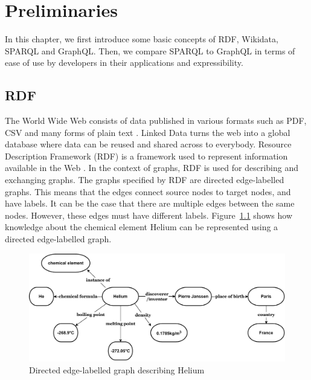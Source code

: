 \chapter{Preliminaries}
In this chapter, we first introduce some basic concepts of RDF, Wikidata, SPARQL and GraphQL. Then, we compare SPARQL to GraphQL in terms of ease of use by developers in their applications and expressibility.

\section{RDF}
The World Wide Web consists of data published in various formats such as PDF, CSV and many forms of plain text \cite{Ruth2013}. Linked Data turns the web into a global database where data can be reused and shared across to everybody. Resource Description Framework (RDF) is a framework used to represent information available in the Web \cite{R.Cyganiak2014}. In the context of graphs, RDF is used for describing and exchanging graphs. The graphs specified by RDF are directed edge-labelled graphs. This means that the edges connect source nodes to target nodes, and have labels. It can be the case that there are multiple edges between the same nodes. However, these edges must have different labels. Figure~\ref{fig:figure 1} shows how knowledge about the chemical element Helium can be represented using a directed edge-labelled graph.

\begin{figure}[h]
  \centering
  \includegraphics[width=0.80\linewidth]{images/del_graph.drawio.pdf}
  \caption{Directed edge-labelled graph describing Helium}
  \label{fig:figure 1}
\end{figure}

